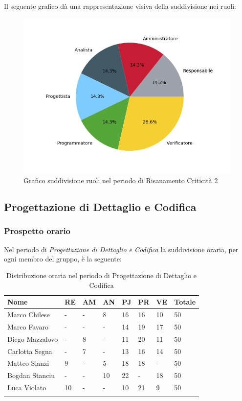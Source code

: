 Il seguente grafico dà una rappresentazione visiva della suddivisione nei ruoli:
\begin{figure}[H]
	\centering
  		\includegraphics[width=0.8\linewidth]{./images/torta_rc2.png}
  		\caption{Grafico suddivisione ruoli nel periodo di Risanamento Criticità 2}
  		\label{fig:grafico suddivione ruoli rc2}
\end{figure}

\newpage
\subsection{Progettazione di Dettaglio e Codifica}
\subsubsection{Prospetto orario}

Nel periodo di \textit{Progettazione di Dettaglio e Codifica} la suddivisione oraria, per ogni membro del gruppo, è la seguente:

\begin{longtable}{|C{.30\textwidth}|C{.06\textwidth}|C{.06\textwidth}|C{.06\textwidth} | C{.06\textwidth}| C{.06\textwidth} | C{.06\textwidth} | C{.10\textwidth} |}
	\hline
	\textbf{Nome} & \textbf{RE} & \textbf{AM} & \textbf{AN} & \textbf{PJ} & \textbf{PR} & \textbf{VE} & \textbf{Totale}\\
	\hline 
	Marco Chilese & - & - & 8 & 16 & 16 & 10 & 50 \\
	\hline
	Marco Favaro &  - & - & - & 14 & 19 & 17 & 50 \\
	\hline
	Diego Mazzalovo & - & 8 & - & 11 & 20 & 11 & 50 \\
	\hline
	Carlotta Segna & - & 7 & - & 13 & 16 & 14 & 50 \\
	\hline
	Matteo Slanzi & 9 & - & 5 & 18 & 18 & - & 50 \\
	\hline
	Bogdan Stanciu & - & - & 10 & 22 & - & 18 & 50 \\
	\hline
	Luca Violato & 10 & - & - & 10 & 21 & 9 & 50 \\   
	\hline


\caption{Distribuzione oraria nel periodo di Progettazione di Dettaglio e Codifica}
\label{Distribuzione oraria pdc}
\end{longtable}

